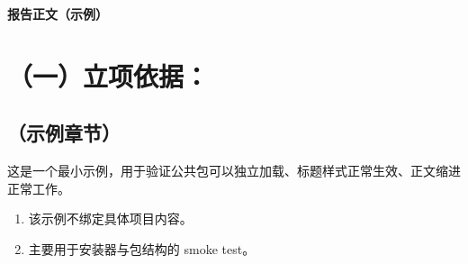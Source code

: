 \documentclass[12pt,UTF8,AutoFakeBold=2.5,a4paper,fontset=none]{ctexart}
\begin{document}
{\centering
{\sanhao \templatefont \bfseries 报告正文（示例）}\par
}

\section{（一）立项依据：}
\subsection{（示例章节）}

\NSFCBodyText
这是一个最小示例，用于验证公共包可以独立加载、标题样式正常生效、正文缩进正常工作。

\begin{enumerate}
\item 该示例不绑定具体项目内容。
\item 主要用于安装器与包结构的 smoke test。
\end{enumerate}
\end{document}
